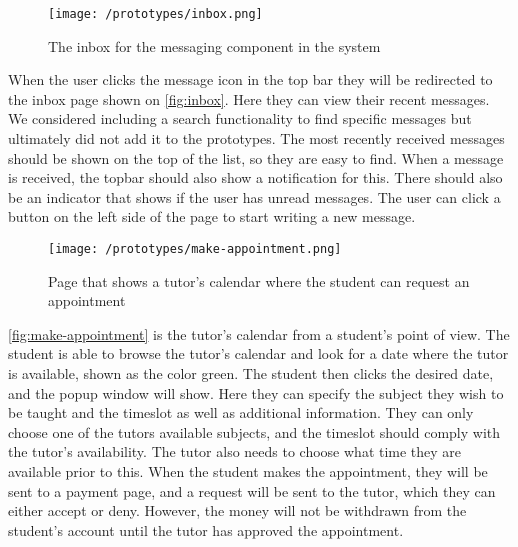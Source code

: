  \begin{figure}[H]
    \texttt{[image: /prototypes/inbox.png]}
     \caption{The inbox for the messaging component in the system}
     \label{fig:inbox}
 \end{figure}
 \noindent
When the user clicks the message icon in the top bar they will be redirected to the inbox page shown on \autoref{fig:inbox}.
Here they can view their recent messages. 
We considered including a search functionality to find specific messages but ultimately did not add it to the prototypes. 
The most recently received messages should be shown on the top of the list, so they are easy to find. 
When a message is received, the topbar should also show a notification for this. 
There should also be an indicator that shows if the user has unread messages. 
The user can click a button on the left side of the page to start writing a new message. 


 \begin{figure}[H]
    \centering
    \texttt{[image: /prototypes/make-appointment.png]}
     \caption{Page that shows a tutor's calendar where the student can request an appointment}
     \label{fig:make-appointment}
 \end{figure}
 \noindent
 \autoref{fig:make-appointment} is the tutor's calendar from a student's point of view. 
 The student is able to browse the tutor's calendar and look for a date where the tutor is available, shown as the color green. 
 The student then clicks the desired date, and the popup window will show. 
 Here they can specify the subject they wish to be taught and the timeslot as well as additional information. 
 They can only choose one of the tutors available subjects, and the timeslot should comply with the tutor's availability. 
 The tutor also needs to choose what time they are available prior to this.
 When the student makes the appointment, they will be sent to a payment page, and a request will be sent to the tutor, which they can either accept or deny.
 However, the money will not be withdrawn from the student's account until the tutor has approved the appointment.

